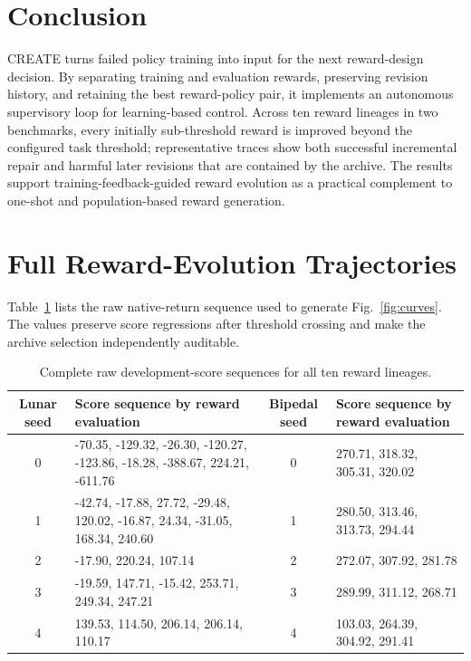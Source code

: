 \section{Conclusion}
CREATE turns failed policy training into input for the next reward-design decision. By separating training and evaluation rewards, preserving revision history, and retaining the best reward-policy pair, it implements an autonomous supervisory loop for learning-based control. Across ten reward lineages in two benchmarks, every initially sub-threshold reward is improved beyond the configured task threshold; representative traces show both successful incremental repair and harmful later revisions that are contained by the archive. The results support training-feedback-guided reward evolution as a practical complement to one-shot and population-based reward generation.

\appendices
\section{Full Reward-Evolution Trajectories}
Table~\ref{tab:fulltraj} lists the raw native-return sequence used to generate Fig.~\ref{fig:curves}. The values preserve score regressions after threshold crossing and make the archive selection independently auditable.

\begin{table}[t]
\caption{Complete raw development-score sequences for all ten reward lineages.}
\label{tab:fulltraj}
\centering
\scriptsize
\setlength{\tabcolsep}{3.0pt}
\begin{tabular}{cl|cl}
\toprule
Lunar seed & Score sequence by reward evaluation & Bipedal seed & Score sequence by reward evaluation \\
\midrule
0 & -70.35, -129.32, -26.30, -120.27, -123.86, -18.28, -388.67, 224.21, -611.76 & 0 & 270.71, 318.32, 305.31, 320.02 \\
1 & -42.74, -17.88, 27.72, -29.48, 120.02, -16.87, 24.34, -31.05, 168.34, 240.60 & 1 & 280.50, 313.46, 313.73, 294.44 \\
2 & -17.90, 220.24, 107.14 & 2 & 272.07, 307.92, 281.78 \\
3 & -19.59, 147.71, -15.42, 253.71, 249.34, 247.21 & 3 & 289.99, 311.12, 268.71 \\
4 & 139.53, 114.50, 206.14, 206.14, 110.17 & 4 & 103.03, 264.39, 304.92, 291.41 \\
\bottomrule
\end{tabular}
\end{table}

